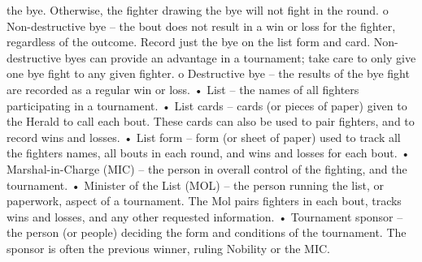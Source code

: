 \documentclass{article}
\begin{document}
the bye. Otherwise, the fighter drawing the bye will not fight in the round.
o Non-destructive bye – the bout does not result in a win or loss for the fighter, regardless of the
outcome. Record just the bye on the list form and card. Non-destructive byes can provide an
advantage in a tournament; take care to only give one bye fight to any given fighter.
o Destructive bye – the results of the bye fight are recorded as a regular win or loss.
• List – the names of all fighters participating in a tournament.
• List cards – cards (or pieces of paper) given to the Herald to call each bout. These cards can also be
used to pair fighters, and to record wins and losses.
• List form – form (or sheet of paper) used to track all the fighters names, all bouts in each round, and
wins and losses for each bout.
• Marshal-in-Charge (MIC) – the person in overall control of the fighting, and the tournament.
• Minister of the List (MOL) – the person running the list, or paperwork, aspect of a tournament. The
Mol pairs fighters in each bout, tracks wins and losses, and any other requested information.
• Tournament sponsor – the person (or people) deciding the form and conditions of the tournament.
The sponsor is often the previous winner, ruling Nobility or the MIC.
\end{document}
